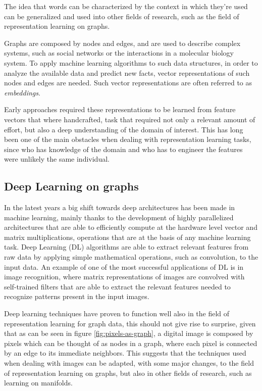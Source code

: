 \documentclass[%
    corpo=13.5pt,
    twoside,
    oldstyle,
    tipotesi=magistrale,
    greek,
    evenboxes
]{toptesi}
\begin{document}
The idea that words can be characterized by the context in which they're used
can be generalized and used into other fields of research, such as
the field of representation learning on graphs.

Graphs are composed by nodes and edges, and are used to describe complex
systems, such as social networks or the interactions in a molecular biology
system. To apply machine learning algorithms to such data structures, in order
to analyze the available data and predict new facts, vector representations of
such nodes and edges are needed. Such vector representations are often
referred to as \emph{embeddings}.

Early approaches required these representations to be learned from feature
vectors that where handcrafted, task that required not
only a relevant amount of effort, but also a deep understanding of the domain
of interest. This has long been one of the main obstacles when dealing with
representation learning tasks, since who has knowledge of the domain and who
has to engineer the features were unlikely the same individual.


\subsection{Deep Learning on graphs}

In the latest years a big shift towards deep architectures has been made
in machine learning, mainly thanks to the development of highly
parallelized architectures that are able to efficiently compute
at the hardware level vector and matrix multiplications, operations that
are at the basis of any machine learning task.
Deep Learning (DL) algorithms are able to extract relevant features from
raw data by applying simple mathematical operations, such as convolution, to
the input data.
An example of one of the most successful applications of DL is in
image recognition, where matrix representations of images are
convolved with self-trained filters that are able to
extract the relevant features needed to recognize patterns present
in the input images.

Deep learning techniques have proven to function well also in the field of
representation learning for graph data, this should not give rise to surprise,
given that as can be seen in figure \ref{fig:pixels-as-graph}, a digital image
is composed by pixels which can be thought of as nodes in a graph, where
each pixel is connected by an edge to its immediate neighbors. This suggests
that the techniques used when dealing with images can be adapted, with
some major changes, to the field of representation learning on graphs, but
also in other fields of research, such as learning on manifolds.
\end{document}
